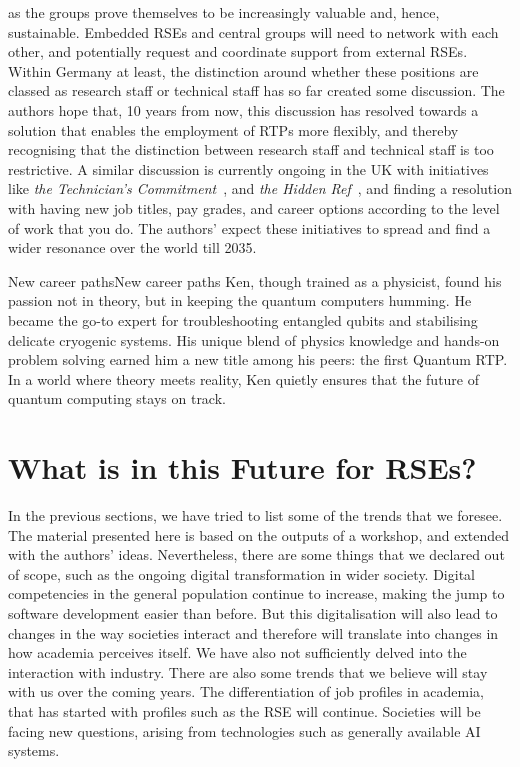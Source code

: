 \documentclass{eceasst}
\begin{document}
as the groups prove themselves to be increasingly valuable and, hence, sustainable.
Embedded RSEs and central groups will need to network with each other,
and potentially request and coordinate support from external RSEs.
Within Germany at least, the distinction around whether these positions are classed as research staff or technical staff has so far created some discussion.
The authors hope that, 10 years from now, this discussion has resolved towards a solution that enables the employment of RTPs more flexibly,
and thereby recognising that the distinction between research staff and technical staff is too restrictive.
A similar discussion is currently ongoing in the UK with initiatives like \emph{the Technician's Commitment}~\cite{techniciancommitment}, and \emph{the Hidden Ref}~\cite{hiddenref},
and finding a resolution with having new job titles, pay grades, and career options according to the level of work that you do.
The authors' expect these initiatives to spread and find a wider resonance over the world till 2035.

\begin{story}{New career paths}{New career paths}
Ken, though trained as a physicist, found his passion not in theory,
but in keeping the quantum computers humming. He became the go-to expert
for troubleshooting entangled qubits and stabilising delicate cryogenic systems.
His unique blend of physics knowledge and hands-on problem solving earned him
a new title among his peers: the first Quantum RTP.
In a world where theory meets reality, Ken quietly ensures that the future
of quantum computing stays on track.
\end{story}

\section{What is in this Future for RSEs?}
In the previous sections, we have tried to list some of the trends that we foresee.
The material presented here is based on the outputs of a workshop, and extended with the authors' ideas.
Nevertheless, there are some things that we declared out of scope, such as the ongoing digital transformation in wider society.
Digital competencies in the general population continue to increase,
making the jump to software development easier than before.
But this digitalisation will also lead to changes in the way societies
interact and therefore will translate into changes in how academia perceives itself.
We have also not sufficiently delved into the interaction with industry.
There are also some trends that we believe will stay with us over the coming years.
The differentiation of job profiles in academia, that has started with profiles such as the RSE will continue.
Societies will be facing new questions, arising from technologies such as generally available AI systems.
\end{document}
